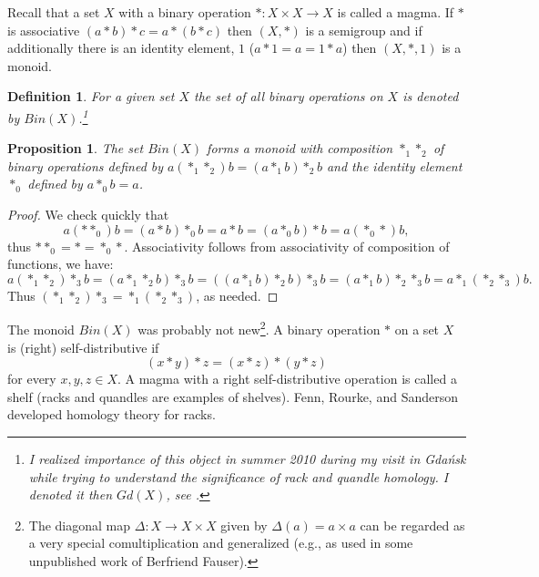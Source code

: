 \documentclass[12pt]{amsart}
\newtheorem{definition}[theorem]{Definition}
\newtheorem{proposition}[theorem]{Proposition}
\begin{document}
Recall that a set $X$ with a binary operation $*: X\times X \to X$ is called a magma. If $*$ is associative $(a*b)*c=a*(b*c)$ then $(X,*)$ is a semigroup and if additionally there is an identity element, $1$ ($a*1=a=1*a$) then $(X,*,1)$ is a monoid.

\begin{definition}\label{Bin1}
For a given set $X$ the set of all binary operations on $X$ is denoted by $Bin(X)$.\footnote{I realized importance of this object in summer 2010 during my visit in Gda\'nsk while trying to understand the significance of rack and quandle homology. I denoted it then $Gd(X)$, see \cite{Prz9}.}
\end{definition}
\begin{proposition}\label{Bin2}
The set $Bin(X)$ forms a monoid with composition $*_1*_2$ of binary operations defined by $a(*_1*_2)b= (a*_1b)*_2b$ and the identity element 
$*_0$ defined by $a*_0b=a$.
\end{proposition}
\begin{proof} We check quickly that 
\begin{equation*}
a(**_0)b= (a*b)*_0b=a*b= (a*_0b)*b=a(*_0*)b,
\end{equation*}
thus $**_0=*=*_0*$. Associativity follows from associativity of composition of functions, we have:
\begin{equation*}
a(*_1*_2)*_3b=(a*_1*_2b)*_3b=((a*_1b)*_2b)*_3b=(a*_1b)*_2*_3b=a*_1(*_2*_3)b.  
\end{equation*}
Thus $(*_1*_2)*_3= *_1(*_2*_3)$, as needed.
\end{proof}

The monoid $Bin(X)$ was probably not new\footnote{The diagonal map $\Delta :X\rightarrow X\times X$ given by $\Delta(a)=a\times a$ can be regarded as a very special comultiplication and generalized (e.g., as used in some unpublished work of Berfriend Fauser).}. A binary operation $\ast $ on a set $X$ is (right) self-distributive if 
\begin{equation*}
(x\ast y)\ast z = (x\ast z)\ast (y\ast z)
\end{equation*}
for every $x,y,z\in X$. A magma with a right self-distributive operation is called a shelf (racks and quandles are examples of shelves). Fenn, Rourke, and Sanderson developed homology theory for racks.
\end{document}
